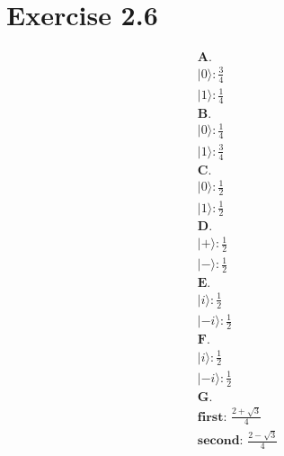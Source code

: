 \documentclass{article}
\def\ket#1{|#1\rangle}
\begin{document}
\section{Exercise 2.6 }
\begin{align*}
&\textbf{A. } \\ 
& \ket{0}: \frac{3}{4} \\ 
& \ket{1}: \frac{1}{4} \\
&\textbf{B. } \\ 
& \ket{0}: \frac{1}{4} \\ 
& \ket{1}: \frac{3}{4} \\
&\textbf{C. } \\ 
& \ket{0}: \frac{1}{2} \\ 
& \ket{1}: \frac{1}{2} \\
&\textbf{D. } \\ 
& \ket{+}: \frac{1}{2} \\ 
& \ket{-}: \frac{1}{2} \\
&\textbf{E. } \\ 
& \ket{i}: \frac{1}{2} \\ 
& \ket{-i}: \frac{1}{2} \\
&\textbf{F. } \\ 
& \ket{i}: \frac{1}{2} \\ 
& \ket{-i}: \frac{1}{2} \\
&\textbf{G. } \\ 
& \textbf{first: } \frac{2 + \sqrt{3}}{4} \\ 
& \textbf{second: } \frac{2 - \sqrt{3}}{4}
\end{align*}
\end{document}
